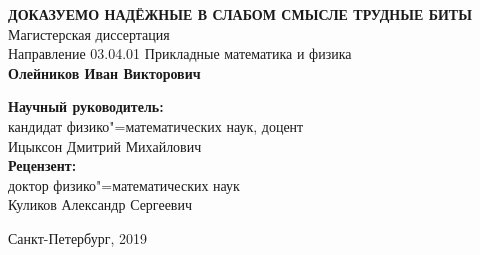 \begin{titlepage}

\begin{center}
\end{center}

\vspace{2cm}
\begin{center}
  \MakeUppercase{\textbf{Доказуемо надёжные в слабом смысле трудные биты}}
  \\
  Магистерская диссертация
  \\[1cm]
  Направление 03.04.01 Прикладные математика и физика
  \\[1cm]
  {\fontsize{18}{21.6}\selectfont
    \textbf{Олейников Иван Викторович}
  }
  \\[2cm]
\end{center}

\hfill
\begin{minipage}{0.6\textwidth}
\textbf{Научный руководитель:} \\
кандидат физико"=математических наук, доцент \\
Ицыксон Дмитрий Михайлович \\[0.5cm]
\textbf{Рецензент:} \\
доктор физико"=математических наук \\
Куликов Александр Сергеевич
\end{minipage}

\begin{center}
\mbox{}
\vfill
Санкт-Петербург, 2019
\end{center}

\end{titlepage}
\newpage
